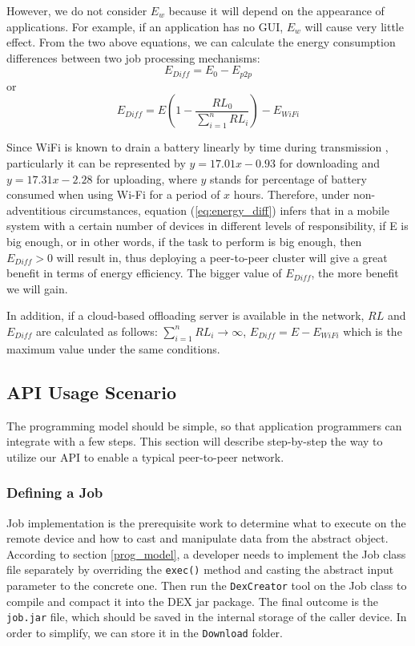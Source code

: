 \documentclass{sig-alternate}[10pt]
\begin{document}
However, we do not consider $E_{w}$ because it will depend on the appearance of applications. For example, if an application has no GUI, $E_{w}$ will cause very little effect. From the two above equations, we can calculate the energy consumption differences between two job processing mechanisms:
$$E_{Diff} = E_{0} - E_{p2p}$$ 
or 
\begin{equation}
\label{eq:energy_diff}
E_{Diff} = E(1 - \frac{RL_{0}}{\sum_{i=1}^{n}{RL_{i}}}) - E_{WiFi}
\end{equation}

Since WiFi is known to drain a battery linearly by time during transmission \cite{wifi_energy}, particularly it can be represented by $y = 17.01x - 0.93$ for downloading and $y = 17.31x - 2.28$ for uploading, where $y$ stands for percentage of battery consumed when using Wi-Fi for a period of $x$ hours. Therefore, under non-adventitious circumstances, equation (\ref{eq:energy_diff}) infers that in a mobile system with a certain number of devices in different levels of responsibility, if E is big enough, or in other words, if the task to perform is big enough, then $E_{Diff} > 0$ will result in, thus deploying a peer-to-peer cluster will give a great benefit in terms of energy efficiency. The bigger value of $E_{Diff}$, the more benefit we will gain. 

In addition, if a cloud-based offloading server is available in the network, $RL$ and $E_{Diff}$ are calculated as follows: $\sum_{i=1}^{n}{RL_{i}} \rightarrow \infty$, $E_{Diff} = E - E_{WiFi}$ which is the maximum value under the same conditions.

\subsection{API Usage Scenario}
The programming model should be simple, so that application programmers can integrate with a few steps. This section will describe step-by-step the way to utilize our API to enable a typical peer-to-peer network.

\subsubsection{Defining a Job}
Job implementation is the prerequisite work to determine what to execute on the remote device and how to cast and manipulate data from the abstract object. According to section \ref{prog_model}, a developer needs to implement the Job class file separately by overriding the \texttt{exec()} method and casting the abstract input parameter to the concrete one. Then run the \texttt{DexCreator} tool on the Job class to compile and compact it into the DEX jar package. The final outcome is the \texttt{job.jar} file, which should be saved in the internal storage of the caller device. In order to simplify, we can store it in the \texttt{Download} folder.  
\end{document}
